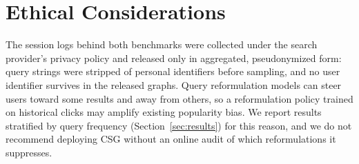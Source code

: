 \section*{Ethical Considerations}
The session logs behind both benchmarks were collected under the search provider's privacy
policy and released only in aggregated, pseudonymized form: query strings were stripped of
personal identifiers before sampling, and no user identifier survives in the released
graphs. Query reformulation models can steer users toward some results and away from
others, so a reformulation policy trained on historical clicks may amplify existing
popularity bias. We report results stratified by query frequency (Section~\ref{sec:results})
for this reason, and we do not recommend deploying CSG without an online audit of which
reformulations it suppresses.
